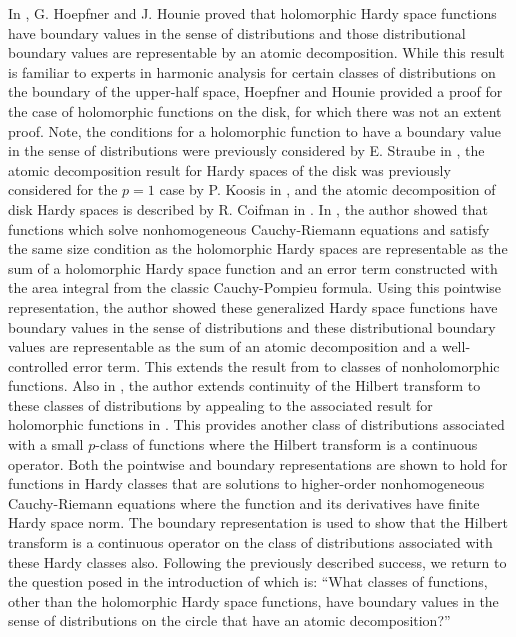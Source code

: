 \documentclass[suppldata]{interact}
\theoremstyle{plain}%
\theoremstyle{definition}
\theoremstyle{remark}
\begin{document}
In \cite{GHJH2}, G. Hoepfner and J. Hounie proved that holomorphic Hardy space functions have boundary values in the sense of distributions and those distributional boundary values are representable by an atomic decomposition. While this result is familiar to experts in harmonic analysis for certain classes of distributions on the boundary of the upper-half space, Hoepfner and Hounie provided a proof for the case of holomorphic functions on the disk, for which there was not an extent proof. Note, the conditions for a holomorphic function to have a boundary value in the sense of distributions were previously considered by E. Straube in \cite{Straube}, the atomic decomposition result for Hardy spaces of the disk was previously considered for the $p=1$ case by P. Koosis in \cite{Koosis}, and the atomic decomposition of disk Hardy spaces is described by R. Coifman in \cite{Coif2}. In \cite{WB}, the author showed that functions which solve nonhomogeneous Cauchy-Riemann equations and satisfy the same size condition as the holomorphic Hardy spaces are representable as the sum of a holomorphic Hardy space function and an error term constructed with the area integral from the classic Cauchy-Pompieu formula. Using this pointwise representation, the author showed these generalized Hardy space functions have boundary values in the sense of distributions and these distributional boundary values are representable as the sum of an atomic decomposition and a well-controlled error term. This extends the result from \cite{GHJH2} to classes of nonholomorphic functions. Also in \cite{WB}, the author extends continuity of the Hilbert transform to these classes of distributions by appealing to the associated result for holomorphic functions in \cite{GHJH2}. This provides another class of distributions associated with a small $p$-class of functions where the Hilbert transform is a continuous operator. Both the pointwise and boundary representations are shown to hold for functions in Hardy classes that are solutions to higher-order nonhomogeneous Cauchy-Riemann equations where the function and its derivatives have finite Hardy space norm. The boundary representation is used to show that the Hilbert transform is a continuous operator on the class of distributions associated with these Hardy classes also. Following the previously described success, we return to the question posed in the introduction of \cite{WB} which is: ``What classes of functions, other than the holomorphic Hardy space functions, have boundary values in the sense of distributions on the circle that have an atomic decomposition?'' 
\end{document}
